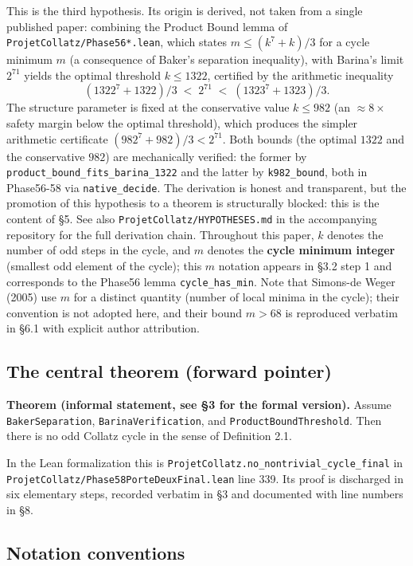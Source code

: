 \documentclass[
  11pt]{amsart}
\theoremstyle{plain}
\theoremstyle{definition}
\theoremstyle{remark}
\begin{document}
This is the third hypothesis. Its origin is derived, not taken from a
single published paper: combining the Product Bound lemma of
\texttt{ProjetCollatz/Phase56*.lean}, which states
\(m \leq (k^7 + k)/3\) for a cycle minimum \(m\) (a consequence of
Baker's separation inequality), with Barina's limit \(2^{71}\) yields
the optimal threshold \(k \leq 1322\), certified by the arithmetic
inequality \[
(1322^7 + 1322)/3 \;<\; 2^{71} \;<\; (1323^7 + 1323)/3.
\] The structure parameter is fixed at the conservative value
\(k \leq 982\) (an \(\approx 8\times\) safety margin below the optimal
threshold), which produces the simpler arithmetic certificate
\((982^7 + 982)/3 < 2^{71}\). Both bounds (the optimal \(1322\) and the
conservative \(982\)) are mechanically verified: the former by
\texttt{product\_bound\_fits\_barina\_1322} and the latter by
\texttt{k982\_bound}, both in Phase56-58 via \texttt{native\_decide}.
The derivation is honest and transparent, but the promotion of this
hypothesis to a theorem is structurally blocked: this is the content of
§5. See also \texttt{ProjetCollatz/HYPOTHESES.md} in the accompanying
repository for the full derivation chain. Throughout this paper, \(k\)
denotes the number of odd steps in the cycle, and \(m\) denotes the
\textbf{cycle minimum integer} (smallest odd element of the cycle); this
\(m\) notation appears in §3.2 step 1 and corresponds to the Phase56
lemma \texttt{cycle\_has\_min}. Note that Simons-de Weger (2005) use
\(m\) for a distinct quantity (number of local minima in the cycle);
their convention is not adopted here, and their bound \(m > 68\) is
reproduced verbatim in §6.1 with explicit author attribution.

\subsection{The central theorem (forward
pointer)}\label{the-central-theorem-forward-pointer}

\textbf{Theorem (informal statement, see §3 for the formal version).}
Assume \texttt{BakerSeparation}, \texttt{BarinaVerification}, and
\texttt{ProductBoundThreshold}. Then there is no odd Collatz cycle in
the sense of Definition 2.1.

In the Lean formalization this is
\texttt{ProjetCollatz.no\_nontrivial\_cycle\_final} in
\texttt{ProjetCollatz/Phase58PorteDeuxFinal.lean} line 339. Its proof is
discharged in six elementary steps, recorded verbatim in §3 and
documented with line numbers in §8.

\subsection{Notation conventions}\label{notation-conventions}
\end{document}
